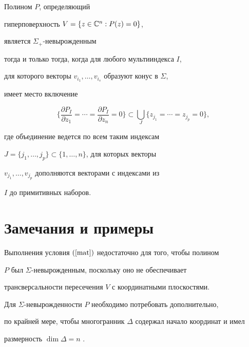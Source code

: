 \begin{prop}


Полином $P$, определяющий


гиперповерхность $V=\{z\in\Bbb C^n : P(z)=0\}$,


является $\Sigma_+$-невырожденным


тогда и только тогда, когда для любого мультииндекса $I$,


для которого векторы $v_{i_1},\dotsc, v_{i_s}$ образуют конус в $\Sigma$,


имеет место включение


\begin{equation}


\label{mat}


\bigg\{


\frac{\partial P_I}{\partial z_1} =\dotsb =


\frac{\partial P_I}{\partial z_n} =0


\bigg\}


\subset \bigcup\limits_J


\{z_{j_1} =\dotsb= z_{j_p}=0\},


\end{equation}


где объединение ведется по всем таким индексам


$J=\{j_1,\dotsc,j_p\}\subset \{1,\dotsc,n \}$, для которых векторы


$v_{j_1},\dotsc, v_{j_p}$ дополняются векторами с индексами из


$I$ до примитивных наборов.


\end{prop}





\section{Замечания и примеры}





\begin{note}


Выполнения условия $(\ref{mat})$ недостаточно для того, чтобы полином


$P$ был $\Sigma$-невырожденным, поскольку оно не обеспечивает


трансверсальности пересечения $V$ с координатными плоскостями.


Для $\Sigma$-невырожденности $P$ необходимо потребовать дополнительно,


по крайней мере, чтобы многогранник $\Delta$ содержал начало координат и имел


размерность $\dim\Delta=n$ \cite{H1}.


\end{note}





